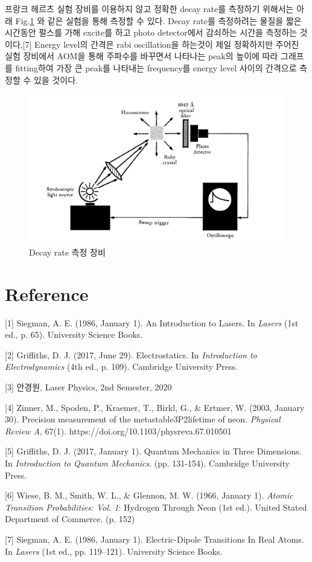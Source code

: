 \documentclass[%
 reprint,
 amsmath,amssymb,
 aps,
]{revtex4-2}
\begin{document}
프랑크 헤르츠 실험 장비를 이용하지 않고 정확한 decay rate를 측정하기 위해서는 아래 Fig.\ref{fig:ADVEXP} 와 같은 실험을 통해 측정할 수 있다. Decay rate를 측정하려는 물질을 짧은 시간동안 펄스를 가해 excite를 하고 photo detector에서 감쇠하는 시간을 측정하는 것이다,[7] Energy level의 간격은 rabi oscillation을 하는것이 제일 정확하지만 주어진 실험 장비에서 AOM을 통해 주파수를 바꾸면서 나타나는 peak의 높이에 따라 그래프를 fitting하여 가장 큰 peak를 나타내는 frequency를 energy level 사이의 간격으로 측정할 수 있을 것이다.
\begin{figure}[htbp]
	\includegraphics[width = 0.85\linewidth]{ADVEXP.png}%
	\caption{\label{fig:ADVEXP}Decay rate 측정 장비}
\end{figure}
 

\section{Reference}
[1] Siegman, A. E. (1986, January 1). An Introduction to Lasers. In \textit{Lasers} (1st ed., p. 65). University Science Books.

[2] Griffiths, D. J. (2017, June 29). Electrostatics. In \textit{Introduction to Electrodynamics} (4th ed., p. 109). Cambridge University Press.

[3] 안경원, Laser Physics, 2nd Semester, 2020

[4] Zinner, M., Spoden, P., Kraemer, T., Birkl, G., \& Ertmer, W. (2003, January 30). Precision measurement of the metastable3P2lifetime of neon. \textit{Physical Review A}, 67(1). https://doi.org/10.1103/physreva.67.010501

[5] Griffiths, D. J. (2017, January 1). Quantum Mechanics in Three Dimensions. In \textit{Introduction to Quantum Mechanics}. (pp. 131-154). Cambridge University Press.

[6] Wiese, B. M., Smith, W. L., \& Glennon, M. W. (1966, January 1). \textit{Atomic Transition Probabilities: Vol. 1}: Hydrogen Through Neon (1st ed.). United Stated Department of Commerce. (p. 152)

[7] Siegman, A. E. (1986, January 1). Electric-Dipole Transitions In Real Atoms. In \textit{Lasers} (1st ed., pp. 119–121). University Science Books.
\end{document}
